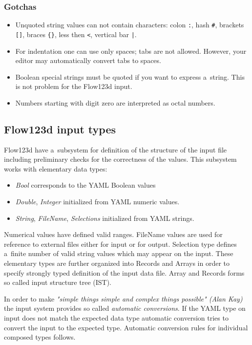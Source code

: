 \subsubsection{Gotchas}
\begin{itemize}
 \item Unquoted string values can not contain characters: colon \verb':', hash \verb'#', 
 brackets \verb'[]', braces \verb'{}', less then \verb'<', vertical bar \verb'|'.
 \item For indentation one can use only spaces; tabs are not allowed. However, your editor may automatically convert tabs to spaces.
 \item Boolean special strings must be quoted if you want to express a~string. This is not problem for the Flow123d input.
 \item Numbers starting with digit zero are interpreted as octal numbers. 
\end{itemize}

\subsection{Flow123d input types}
\label{sec:input_types}
Flow123d have a~subsystem for definition of the structure of the input file including preliminary checks for the 
correctness of the values. This subsystem works with elementary data types:
\begin{itemize}
 \item {\it Bool} corresponds to the YAML Boolean values
 \item {\it Double}, {\it Integer} initialized from YAML numeric values. 
 \item {\it String}, {\it FileName}, {\it Selections} initialized from YAML strings.
\end{itemize}
Numerical values have defined valid ranges. FileName values are used for reference to external files either for input or for output.
Selection type defines a~finite number of valid string values which may appear on the input. 
These elementary types are further organized into Records and Arrays in order to specify strongly typed definition of the 
input data file. Array and Records forms so called input structure tree (IST).

In order to make {\it "simple things simple and complex things possible" (Alan Kay)} the input system provides
so called {\it automatic conversions}. If the YAML type on input does not match the expected data type automatic conversion tries to convert 
the input to the expected type. Automatic conversion rules for individual composed types follows.


